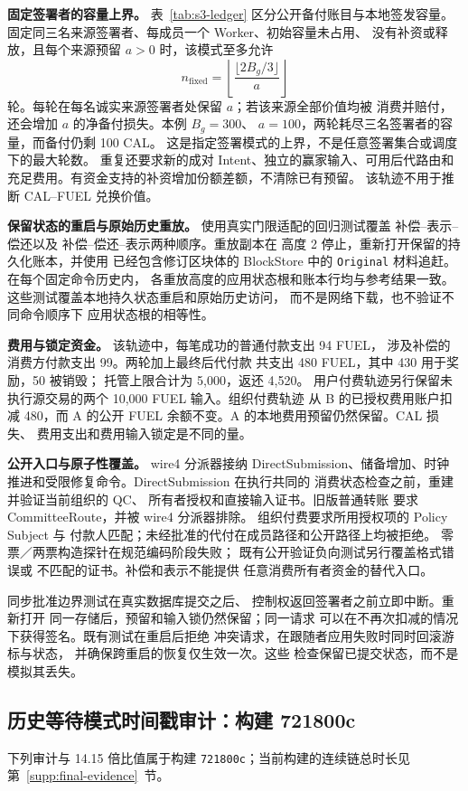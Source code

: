 \noindent\textbf{固定签署者的容量上界。}
表~\ref{tab:s3-ledger} 区分公开备付账目与本地签发容量。
固定同三名来源签署者、每成员一个 Worker、初始容量未占用、
没有补资或释放，且每个来源预留 $a>0$ 时，该模式至多允许
\[
  n_{\mathrm{fixed}}=\left\lfloor
       \frac{\lfloor2B_g/3\rfloor}{a}\right\rfloor
\]
轮。每轮在每名诚实来源签署者处保留 $a$；若该来源全部价值均被
消费并赔付，还会增加 $a$ 的净备付损失。本例 $B_g=300$、
$a=100$，两轮耗尽三名签署者的容量，而备付仍剩 100 CAL。
这是指定签署模式的上界，不是任意签署集合或调度下的最大轮数。
重复还要求新的成对 Intent、独立的赢家输入、可用后代路由和
充足费用。有资金支持的补资增加份额差额，不清除已有预留。
该轨迹不用于推断 CAL--FUEL 兑换价值。

\noindent\textbf{保留状态的重启与原始历史重放。}
使用真实门限适配的回归测试覆盖
补偿--表示--偿还以及
补偿--偿还--表示两种顺序。重放副本在
高度 2 停止，重新打开保留的持久化账本，并使用
已经包含修订区块体的 BlockStore 中的
\texttt{Original} 材料追赶。在每个固定命令历史内，
各重放高度的应用状态根和账本行均与参考结果一致。
这些测试覆盖本地持久状态重启和原始历史访问，
而不是网络下载，也不验证不同命令顺序下
应用状态根的相等性。

\noindent\textbf{费用与锁定资金。}
该轨迹中，每笔成功的普通付款支出 94 FUEL，
涉及补偿的消费方付款支出 99。两轮加上最终后代付款
共支出 480 FUEL，其中 430 用于奖励，50 被销毁；
托管上限合计为 5,000，返还 4,520。
用户付费轨迹另行保留未执行源交易的两个
10,000 FUEL 输入。组织付费轨迹
从 B 的已授权费用账户扣减 480，而 A 的公开 FUEL
余额不变。A 的本地费用预留仍然保留。CAL 损失、
费用支出和费用输入锁定是不同的量。

\noindent\textbf{公开入口与原子性覆盖。}
wire4 分派器接纳 DirectSubmission、储备增加、时钟
推进和受限修复命令。DirectSubmission 在执行共同的
消费状态检查之前，重建并验证当前组织的 QC、
所有者授权和直接输入证书。旧版普通转账
要求 CommitteeRoute，并被 wire4 分派器排除。
组织付费要求所用授权项的 Policy Subject 与
付款人匹配；未经批准的代付在成员路径和公开路径上均被拒绝。
零票／两票构造探针在规范编码阶段失败；
既有公开验证负向测试另行覆盖格式错误或
不匹配的证书。补偿和表示不能提供
任意消费所有者资金的替代入口。

同步批准边界测试在真实数据库提交之后、
控制权返回签署者之前立即中断。重新打开
同一存储后，预留和输入锁仍然保留；同一请求
可以在不再次扣减的情况下获得签名。既有测试在重启后拒绝
冲突请求，在跟随者应用失败时同时回滚游标与状态，
并确保跨重启的恢复仅生效一次。这些
检查保留已提交状态，而不是模拟其丢失。

\subsection{历史等待模式时间戳审计：构建 721800c}
下列审计与 14.15 倍比值属于构建 \texttt{721800c}；当前构建的连续链总时长见第~\ref{supp:final-evidence}~节。

